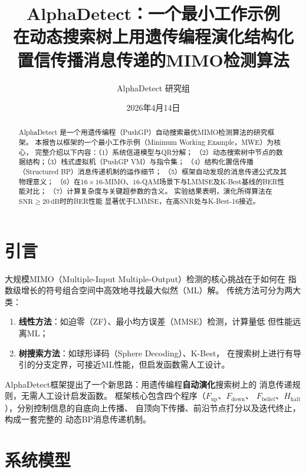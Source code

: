 \documentclass[12pt, a4paper]{ctexart}
\title{%
  \textbf{AlphaDetect：一个最小工作示例}\\[6pt]
  \large 在动态搜索树上用遗传编程演化结构化\\
  置信传播消息传递的MIMO检测算法
}
\author{AlphaDetect 研究组}
\date{2026年4月14日}
\begin{document}
\maketitle

\begin{abstract}
AlphaDetect 是一个用遗传编程（PushGP）自动搜索最优MIMO检测算法的研究框架。
本报告以框架的一个最小工作示例（Minimum Working Example，MWE）为核心，
完整介绍以下内容：（1）系统信道模型与QR分解；
（2）动态搜索树中节点的数据结构；（3）栈式虚拟机（PushGP VM）与指令集；
（4）结构化置信传播（Structured BP）消息传递机制的运作细节；
（5）框架自动发现的消息传递公式及其物理意义；
（6）在$16\times16$-MIMO、$16$-QAM场景下与LMMSE及K-Best基线的BER性能对比；
（7）计算复杂度与关键超参数的含义。
实验结果表明，演化所得算法在$\mathrm{SNR}\geq20\,\mathrm{dB}$时的BER性能
显著优于LMMSE，在高SNR处与K-Best-16接近。
\end{abstract}

\tableofcontents

\bigskip\bigskip

\section{引言}

大规模MIMO（Multiple-Input Multiple-Output）检测的核心挑战在于如何在
指数级增长的符号组合空间中高效地寻找最大似然（ML）解。
传统方法可分为两大类：
\begin{enumerate}[leftmargin=2em]
  \item \textbf{线性方法}：如迫零（ZF）、最小均方误差（MMSE）检测，计算量低
        但性能远离ML；
  \item \textbf{树搜索方法}：如球形译码（Sphere Decoding）、K-Best，
        在搜索树上进行有导引的分支定界，可接近ML性能，但启发函数需人工设计。
\end{enumerate}
AlphaDetect框架提出了一个新思路：用遗传编程\textbf{自动演化}搜索树上的
消息传递规则，无需人工设计启发函数。
框架核心包含四个程序（$F_{\mathrm{up}}$、$F_{\mathrm{down}}$、
$F_{\mathrm{belief}}$、$H_{\mathrm{halt}}$），分别控制信息的自底向上传播、
自顶向下传播、前沿节点打分以及迭代终止，构成一套完整的
动态BP消息传递机制。


\section{系统模型}
\end{document}
